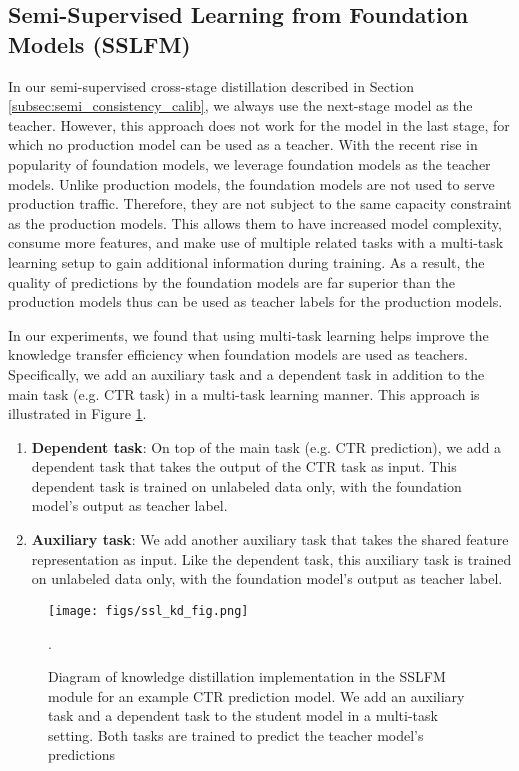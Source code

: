 \subsection{Semi-Supervised Learning from Foundation Models (SSLFM)}
In our semi-supervised cross-stage distillation described in Section \ref{subsec:semi_consistency_calib}, we always use the next-stage model as the teacher. However, this approach does not work for the model in the last stage, for which no production model can be used as a teacher. With the recent rise in popularity of foundation models, we leverage foundation models as the teacher models. Unlike production models, the foundation models are not used to serve production traffic. Therefore, they are not subject to the same capacity constraint as the production models. This allows them to have increased model complexity, consume more features, and make use of multiple related tasks with a multi-task learning setup to gain additional information during training. As a result, the quality of predictions by the foundation models are far superior than the production models thus can be used as teacher labels for the production models.

In our experiments, we found that using multi-task learning helps improve the knowledge transfer efficiency when foundation models are used as teachers. Specifically, we add an auxiliary task and a dependent task in addition to the main task (e.g. CTR task) in a multi-task learning manner. This approach is illustrated in Figure \ref{fig:ssl_em_fig}.
\newline
\begin{enumerate}
    \item \textbf{Dependent task}: On top of the main task (e.g. CTR prediction), we add a dependent task that takes the output of the CTR task as input. This dependent task is trained on unlabeled data only, with the foundation model's output as teacher label.
    \item \textbf{Auxiliary task}: We add another auxiliary task that takes the shared feature representation as input. Like the dependent task, this auxiliary task is trained on unlabeled data only, with the foundation model's output as teacher label.
\end{enumerate}
\vspace{6pt}
\begin{figure}[t]
  \centering
   \texttt{[image: figs/ssl\_kd\_fig.png]}
  \caption{Diagram of knowledge distillation implementation in the SSLFM module for an example CTR prediction model. We add an auxiliary task and a dependent task to the student model in a multi-task setting. Both tasks are trained to predict the teacher model's predictions}.
\label{fig:ssl_em_fig}
\end{figure}

